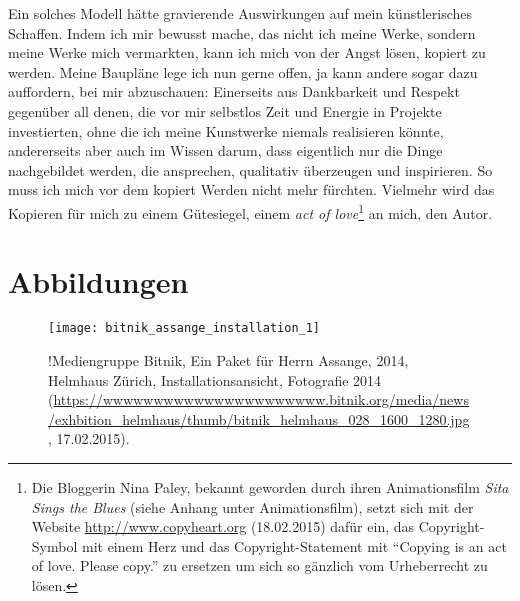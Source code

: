 \documentclass[
paper=164mm:234mm, %
pagesize, %
DIV=calc, %
10pt, %
parskip=half- %
]{scrbook}
\begin{document}
Ein solches Modell hätte gravierende Auswirkungen auf mein künstlerisches Schaffen. Indem ich mir bewusst mache, das nicht ich meine Werke, sondern meine Werke mich vermarkten, kann ich mich von der Angst lösen, kopiert zu werden. Meine Baupläne lege ich nun gerne offen, ja kann andere sogar dazu auffordern, bei mir abzuschauen: Einerseits aus Dankbarkeit und Respekt gegenüber all denen, die vor mir selbstlos Zeit und Energie in Projekte investierten, ohne die ich meine Kunstwerke niemals realisieren könnte, andererseits aber auch im Wissen darum, dass eigentlich nur die Dinge nachgebildet werden, die ansprechen, qualitativ überzeugen und inspirieren. So muss ich mich vor dem kopiert Werden nicht mehr fürchten. Vielmehr wird das Kopieren für mich zu einem Gütesiegel, einem \emph{act of love}\footnote{Die Bloggerin Nina Paley, bekannt geworden durch ihren Animationsfilm \emph{Sita Sings the Blues} (siehe Anhang unter Animationsfilm), setzt sich mit der Website \url{http://www.copyheart.org} (18.02.2015) dafür ein, das Copyright-Symbol mit einem Herz und das Copyright-Statement mit \enquote{Copying is an act of love. Please copy.} zu ersetzen um sich so gänzlich vom Urheberrecht zu lösen.} an mich, den Autor.


{}
%
%
\printbibliography

{}
\chapter*{Abbildungen}
\newpage

\begin{figure}[H]
	\centering
	\texttt{[image: bitnik\_assange\_installation\_1]}
	\caption{!Mediengruppe Bitnik, Ein Paket für Herrn Assange, 2014, Helmhaus Zürich, Installationsansicht, Fotografie 2014 (\url{https://wwwwwwwwwwwwwwwwwwwwww.bitnik.org/media/news/exhbition_helmhaus/thumb/bitnik_helmhaus_028_1600_1280.jpg}, 17.02.2015).}
	\label{fig:bitnik_assange_installation_1}
\end{figure}
\end{document}
